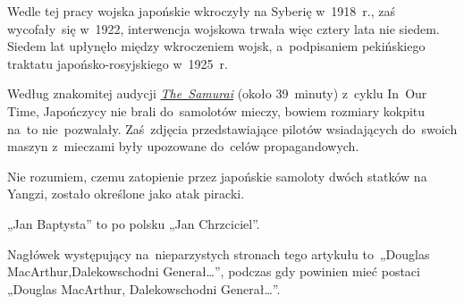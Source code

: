 \documentclass[a4paper,11pt]{article}
\begin{document}
\vspace{\spaceTwo}







\newpage
{}



\start {} Wedle tej pracy wojska japońskie wkroczyły na Syberię
w~1918~r., zaś wycofały~się w~1922, interwencja wojskowa trwała więc
cztery lata nie siedem. Siedem lat upłynęło między wkroczeniem wojsk,
a~podpisaniem pekińskiego traktatu japońsko-rosyjskiego
w~1925~r.

\vspace{\spaceFour}


\start {} Według znakomitej audycji
\href{https://www.bbc.co.uk/programmes/b00pcm9f}{\emph{The~Samurai}}
(około 39~minuty) z~cyklu In~Our Time, Japończycy nie brali
do~samolotów mieczy, bowiem rozmiary kokpitu na~to nie~pozwalały.
Zaś~zdjęcia przedstawiające pilotów wsiadających do~swoich maszyn
z~mieczami były upozowane do~celów propagandowych.

\vspace{\spaceFour}


\start {} Nie rozumiem, czemu zatopienie przez japońskie
samoloty dwóch statków na Yangzi, zostało określone jako atak piracki.

\vspace{\spaceFour}


\start {} „Jan Baptysta” to po polsku „Jan
Chrzciciel”.

\vspace{\spaceFour}


\start {} Nagłówek występujący na~nieparzystych stronach tego
artykułu to~„Douglas MacArthur,Dalekowschodni Generał\ldots”,
podczas gdy powinien mieć postaci „Douglas MacArthur, Dalekowschodni
Generał\ldots”.

\vspace{\spaceFour}
\end{document}
